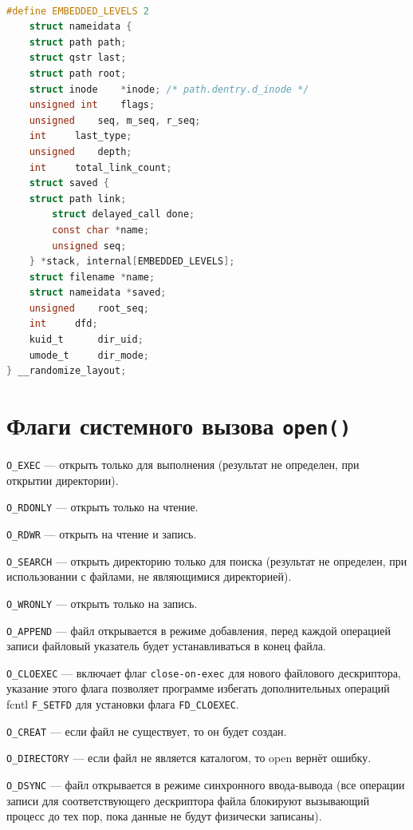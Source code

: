\documentclass[12pt]{report}
\begin{document}
\begin{lstlisting}[language=c, label=lst:nameidata, caption=Листинг структуры nameidata]

#define EMBEDDED_LEVELS 2
	struct nameidata {
	struct path	path;
	struct qstr	last;
	struct path	root;
	struct inode	*inode; /* path.dentry.d_inode */
	unsigned int	flags;
	unsigned	seq, m_seq, r_seq;
	int		last_type;
	unsigned	depth;
	int		total_link_count;
	struct saved {
	struct path link;
		struct delayed_call done;
		const char *name;
		unsigned seq;
	} *stack, internal[EMBEDDED_LEVELS];
	struct filename	*name;
	struct nameidata *saved;
	unsigned	root_seq;
	int		dfd;
	kuid_t		dir_uid;
	umode_t		dir_mode;
} __randomize_layout;
\end{lstlisting}

\section*{Флаги системного вызова \texttt{open()}}

\texttt{O\_EXEC} --- открыть только для выполнения (результат не определен, при открытии директории).

\texttt{O\_RDONLY} --- открыть только на чтение.

\texttt{O\_RDWR} --- открыть на чтение и запись.

\texttt{O\_SEARCH} --- открыть директорию только для поиска (результат не определен, при использовании с файлами, не являющимися директорией).

\texttt{O\_WRONLY} --- открыть только на запись.

\texttt{O\_APPEND} --- файл открывается в режиме добавления, перед каждой операцией записи файловый указатель будет устанавливаться в конец файла.

\texttt{O\_CLOEXEC} --- включает флаг \texttt{close-on-exec} для нового файлового дескриптора, указание этого флага позволяет программе избегать дополнительных операций fcntl \texttt{F\_SETFD} для установки флага \texttt{FD\_CLOEXEC}.

\texttt{O\_CREAT} --- если файл не существует, то он будет создан.

\texttt{O\_DIRECTORY} --- если файл не является каталогом, то open вернёт ошибку.

\texttt{O\_DSYNC} --- файл открывается в режиме синхронного ввода-вывода (все операции записи для соответствующего дескриптора файла блокируют вызывающий процесс до тех пор, пока данные не будут физически записаны).
\end{document}
